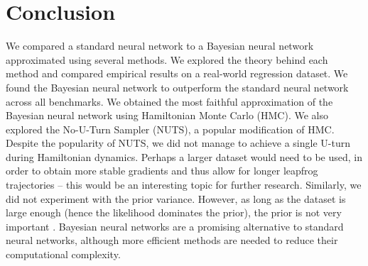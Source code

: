 \documentclass[12pt]{article}
\begin{document}
\section{Conclusion}

We compared a standard neural network to a Bayesian neural network approximated using several methods. We explored the theory behind each method and compared empirical results on a real-world regression dataset. We found the Bayesian neural network to outperform the standard neural network across all benchmarks. We obtained the most faithful approximation of the Bayesian neural network using Hamiltonian Monte Carlo (HMC). We also explored the No-U-Turn Sampler (NUTS), a popular modification of HMC. Despite the popularity of NUTS, we did not manage to achieve a single U-turn during Hamiltonian dynamics. Perhaps a larger dataset would need to be used, in order to obtain more stable gradients and thus allow for longer leapfrog trajectories -- this would be an interesting topic for further research. Similarly, we did not experiment with the prior variance. However, as long as the dataset is large enough (hence the likelihood dominates the prior), the prior is not very important \cite{bnn_posterior}. Bayesian neural networks are a promising alternative to standard neural networks, although more efficient methods are needed to reduce their computational complexity.

\clearpage

\end{document}
